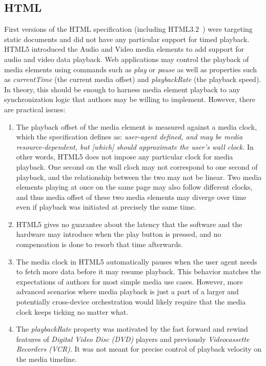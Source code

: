 \documentclass[graybox]{svmult}
\begin{document}
\subsection {HTML}
\label{sec:web-html}

First versions of the HTML specification (including HTML3.2~\cite{html32}) were
targeting static documents and did not have any particular support for timed playback. 
HTML5 introduced the Audio and Video media elements to add support for
\mbox{audio} and video data playback. Web applications may control the playback of
media elements using commands such as \emph{play} or \emph{pause} as well as
properties such as \mbox{\emph{currentTime}} (the current media offset)
and \emph{playbackRate} (the playback speed). In theory, this should be enough
to harness media element playback to any synchronization logic that authors
may be willing to implement. However, there are practical issues:

\begin{enumerate}

\item{

The playback offset of the media element is measured against a media clock,
which the specification defines as: \emph{user-agent defined, and may be media
resource-dependent, but [which] should approximate the user's wall clock.} In
other words, HTML5 does not impose any particular clock for media playback.
One second on the wall clock may not correspond to one second of playback, and
the relationship between the two may not be linear. Two media elements playing
at once on the same page may also follow different clocks, and thus media
offset of these two media elements may diverge over time even if playback was
initiated at precisely the same time.

}

\item{

HTML5 gives no guarantee about the latency that the software and the hardware
may introduce when the play button is pressed, and no compensation is done to
resorb that time afterwards.

}

\item{

The media clock in HTML5 automatically pauses when the user agent needs to
fetch more data before it may resume playback. This behavior matches the
expectations of authors for most simple media use cases. However, more advanced
scenarios where media playback is just a part of a larger and potentially
cross-device orchestration would likely require that the media clock keeps
ticking no matter what.

}

\item{

The \emph{playbackRate} property was motivated by the fast forward and rewind
features of \emph{Digital Video Disc (DVD)} players and previously
\emph{Videocassette Recorders (VCR)}. It was not meant for precise control of
playback velocity on the media timeline.

}

\end{enumerate}
\end{document}
